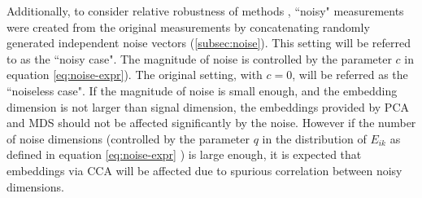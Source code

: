 \documentclass[12pt,oneside,final]{thesis}\usepackage[]{graphicx}\usepackage[]{color}
\begin{document}
 Additionally, to consider  relative robustness of methods , ``noisy" measurements were created from the original measurements by concatenating randomly generated independent noise vectors (\autoref{subsec:noise}).   This setting will be referred to as the ``noisy case". The magnitude of noise is controlled by the parameter $c$ in equation \eqref{eq:noise-expr}). The original setting, with $c=0$,  will be referred as the ``noiseless case".
If the magnitude of noise is small enough, and the embedding dimension is not larger than signal dimension, the embeddings provided by PCA and MDS should not be affected significantly by the noise. However  if the number of noise dimensions (controlled by the parameter $q$ in the distribution of $E_{ik}$ as defined in equation \eqref{eq:noise-expr} ) is large enough, it is expected that embeddings via  CCA  will  be affected due to spurious correlation between noisy dimensions.
\end{document}
